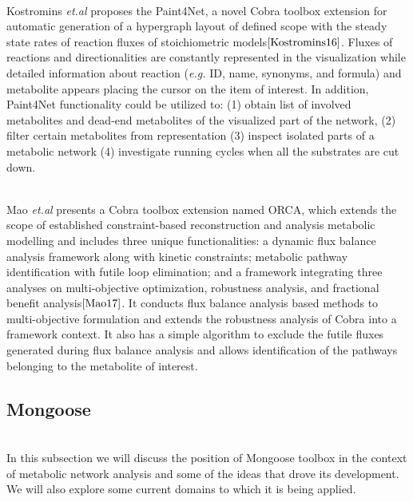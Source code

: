 \documentclass[11pt, a4paper]{article}
\begin{document}
	~\\Kostromins \textit{et.al} proposes the Paint4Net, a novel Cobra toolbox extension for automatic generation of a hypergraph layout of defined scope with the steady state rates of reaction fluxes of stoichiometric models$\cite{Kostromins16}$. Fluxes of reactions and directionalities are constantly represented in the visualization while detailed information about reaction (\textit{e.g.} ID, name, synonyms, and formula) and metabolite appears placing the cursor on the item of interest. In addition, Paint4Net functionality could be utilized to: (1) obtain list of involved metabolites and dead-end metabolites of the visualized part of the network, (2) filter certain metabolites from representation (3) inspect isolated parts of a metabolic network (4) investigate running cycles when all the substrates are cut down.

	~\\Mao \textit{et.al} presents a Cobra toolbox extension named ORCA, which extends the scope of established constraint-based reconstruction and analysis metabolic modelling and includes three unique functionalities: a dynamic flux balance analysis framework along with kinetic constraints; metabolic pathway identification with futile loop elimination; and a framework integrating three analyses on multi-objective optimization, robustness analysis, and fractional benefit analysis$\cite{Mao17}$. It conducts flux balance analysis based methods to multi-objective formulation and extends the robustness analysis of Cobra into a framework context. It also has a simple algorithm to exclude the futile fluxes generated during flux balance analysis and allows identification of the pathways belonging to the metabolite of interest.
	\subsection{Mongoose}
	~\\In this subsection we will discuss the position of Mongoose toolbox in the context of metabolic network analysis and some of the ideas that drove its development. We will also explore some current domains to which it is being applied.
\end{document}
